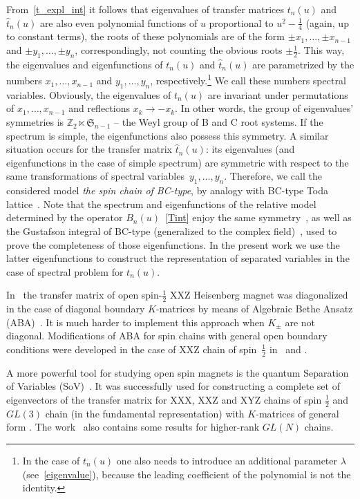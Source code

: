 \documentclass[a4paper,11pt]{article}
\numberwithin{equation}{section}
\begin{document}
From~\eqref{t_expl_int} it follows that eigenvalues of transfer matrices $t_n(u)$ and $\hat{t}_n(u)$ are also even polynomial functions of $u$ proportional to $u^2-\frac{1}{4}$ (again, up to constant terms), the roots of these polynomials are of the form $\pm x_1,\dots, \pm x_{n-1}$ and $\pm y_1, \dots, \pm y_n$, correspondingly, not counting the obvious roots $\pm\frac{1}{2}$.
This way, the eigenvalues and eigenfunctions of $t_n(u)$ and $\hat{t}_n(u)$ are parametrized by the numbers $x_1,\dots, x_{n-1}$ and $y_1, \dots, y_n$, respectively.\footnote{In the case of $t_n(u)$ one also needs to introduce an additional parameter $\lambda$ (see~\eqref{eigenvalue}), because the leading coefficient of the polynomial is not the identity.}
We call these numbers spectral variables.
Obviously, the eigenvalues of $t_n(u)$ are invariant under permutations of $x_1,\dots,x_{n-1}$ and reflections $x_k\to -x_k$. In other words, the group of eigenvalues' symmetries is $\mathbb{Z}_2\ltimes\mathfrak{S}_{n-1}$ -- the Weyl group of B and C root systems.
If the spectrum is simple, the eigenfunctions also possess this symmetry.
A similar situation occurs for the transfer matrix $\hat{t}_n(u)$: its eigenvalues (and eigenfunctions in the case of simple spectrum) are symmetric with respect to the same transformations of spectral variables~$y_1, \dots, y_n$.
Therefore, we call the considered model \textit{the spin chain of BC-type}, by analogy with BC-type Toda lattice~\cite{KuzSk,IS,BDK1,BDK2}.
Note that the spectrum and eigenfunctions of the relative model determined by the operator $B_n(u)$~\eqref{Tint} enjoy the same symmetry~\cite{ADV2}, as well as the Gustafson integral of BC-type (generalized to the complex field)~\cite[eq.~(4.2)]{DM:Gust3}, \cite[eq.~(2.3b)]{DM:Gust4} used to prove the completeness of those eigenfunctions. In the present work we use the latter eigenfunctions to construct the representation of separated variables in the case of spectral problem for $t_n(u)$.

In~\cite{Skl:Boundary} the transfer matrix of open spin-$\frac{1}{2}$ XXZ Heisenberg magnet was diagonalized in the case of diagonal boundary $K$-matrices by means of Algebraic Bethe Ansatz (ABA)~\cite{Fad:BetheAns,FST,KulSk}.
It is much harder to implement this approach when $K_\pm$ are not diagonal.
Modifications of ABA for spin chains with general open boundary conditions were developed in the case of XXZ chain of spin~$\frac{1}{2}$ in~\cite{Belliard2,Belliard3,Belliard4} and \cite{Cao,YangZhang}.

A more powerful tool for studying open spin magnets is the quantum Separation of Variables (SoV)~\cite{Skl:VarSep,Skl91,KK}.
It was successfully used for constructing a complete set of eigenvectors of the transfer matrix for XXX, XXZ and XYZ chains of spin $\frac{1}{2}$ and $GL(3)$ chain (in the fundamental representation) with $K$-matrices of general form \cite{Nicc12,FKN14,FN14,KMN14,KMNT17,KMNT18,MNopen}.
The work~\cite{MNopen} also contains some results for higher-rank $GL(N)$ chains.
\end{document}
